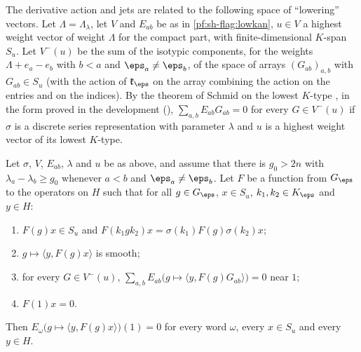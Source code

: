 The derivative action and jets are related to the following space of ``lowering'' vectors. Let $\Lambda=\Lambda_\lambda$,
let $V$ and $E_{ab}$ be as in \cref{pf:sh-flag:lowkan}, $u\in V$ a highest weight vector of weight $\Lambda$ for the compact
part, with finite-dimensional $K$-span $S_u$. Let $V^-(u)$ be the sum of the isotypic components, for the weights
$\Lambda+e_a-e_b$ with $b<a$ and $\eps_a\ne\eps_b$, of the space of arrays $(G_{ab})_{a,b}$ with $G_{ab}\in S_u$ (with the
action of $\mathfrak k_\eps$ on the array combining the action on the entries and on the indices). By the theorem of Schmid
on the lowest $K$-type \cite{Schmid1975}, in the form proved in the development
(), $\sum_{a,b}E_{ab}G_{ab}=0$ for every $G\in V^-(u)$ if $\sigma$ is a
discrete series representation with parameter $\lambda$ and $u$ is a highest weight vector of its lowest $K$-type.

\begin{lemma}\label{pf:sh-flag:germ}
Let $\sigma$, $V$, $E_{ab}$, $\lambda$ and $u$ be as above, and assume that there is $g_0>2n$ with $\lambda_a-\lambda_b\ge g_0$
whenever $a<b$ and $\eps_a\ne\eps_b$. Let $F$ be a function from $G_\eps$ to the operators on $H$ such that for all $g\in
G_\eps$, $x\in S_u$, $k_1,k_2\in K_\eps$ and $y\in H$:
\begin{enumerate}[label=(\alph*)]
\item $F(g)x\in S_u$ and $F(k_1gk_2)x=\sigma(k_1)F(g)\sigma(k_2)x$;
\item $g\mapsto\langle y,F(g)x\rangle$ is smooth;
\item for every $G\in V^-(u)$, $\sum_{a,b}E_{ab}\bigl(g\mapsto\langle y,F(g)G_{ab}\rangle\bigr)=0$ near $1$;
\item $F(1)x=0$.
\end{enumerate}
Then $E_\omega\bigl(g\mapsto\langle y,F(g)x\rangle\bigr)(1)=0$ for every word $\omega$, every $x\in S_u$ and every $y\in H$.
\end{lemma}


